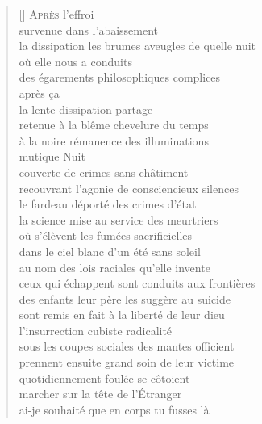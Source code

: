 \documentclass[a4paper, titlepage, twoside, 12pt]{book}
\begin{document}
\newpage
\vspace*{2cm}
\settowidth{\versewidth}{la dissipation les brumes aveugles de quelle nuit}
\begin{verse}[\versewidth]
{\lettrine[lines=1]{\textcolor[gray]{0.6}{A}}{\space près}} l'effroi\\
survenue dans l'abaissement\\
la dissipation les brumes aveugles de quelle nuit\\
où elle nous a conduits\\
des égarements philosophiques complices\\
après ça\\
la lente dissipation partage\\
retenue à la blême chevelure du temps\\
à la noire rémanence des illuminations\\
mutique Nuit\\
couverte de crimes sans châtiment\\
recouvrant l'agonie de consciencieux silences\\
le fardeau déporté des crimes d'état\\
la science mise au service des meurtriers\\
où s'élèvent les fumées sacrificielles\\
dans le ciel blanc d'un été sans soleil\\
au nom des lois raciales qu'elle invente\\
ceux qui échappent sont conduits aux frontières\\
des enfants leur père les suggère au suicide\\
sont remis en fait à la liberté de leur dieu\\
l'insurrection cubiste radicalité\\
sous les coupes sociales des mantes officient\\
prennent ensuite grand soin de leur victime\\
quotidiennement foulée se côtoient\\
marcher sur la tête de l'\'Etranger\\
ai-je souhaité que en corps tu fusses là

\end{verse}
\end{document}
